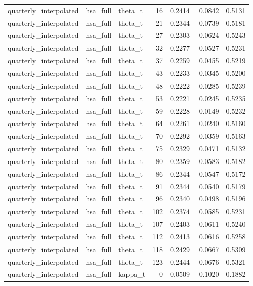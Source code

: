 \begin{tabular}{lllrrrr}
quarterly\_interpolated & hsa\_full & theta\_t & 16 & 0.2414 & 0.0842 & 0.5131 \\
quarterly\_interpolated & hsa\_full & theta\_t & 21 & 0.2344 & 0.0739 & 0.5181 \\
quarterly\_interpolated & hsa\_full & theta\_t & 27 & 0.2303 & 0.0624 & 0.5243 \\
quarterly\_interpolated & hsa\_full & theta\_t & 32 & 0.2277 & 0.0527 & 0.5231 \\
quarterly\_interpolated & hsa\_full & theta\_t & 37 & 0.2259 & 0.0455 & 0.5219 \\
quarterly\_interpolated & hsa\_full & theta\_t & 43 & 0.2233 & 0.0345 & 0.5200 \\
quarterly\_interpolated & hsa\_full & theta\_t & 48 & 0.2222 & 0.0285 & 0.5239 \\
quarterly\_interpolated & hsa\_full & theta\_t & 53 & 0.2221 & 0.0245 & 0.5235 \\
quarterly\_interpolated & hsa\_full & theta\_t & 59 & 0.2228 & 0.0149 & 0.5232 \\
quarterly\_interpolated & hsa\_full & theta\_t & 64 & 0.2261 & 0.0240 & 0.5160 \\
quarterly\_interpolated & hsa\_full & theta\_t & 70 & 0.2292 & 0.0359 & 0.5163 \\
quarterly\_interpolated & hsa\_full & theta\_t & 75 & 0.2329 & 0.0471 & 0.5132 \\
quarterly\_interpolated & hsa\_full & theta\_t & 80 & 0.2359 & 0.0583 & 0.5182 \\
quarterly\_interpolated & hsa\_full & theta\_t & 86 & 0.2344 & 0.0547 & 0.5172 \\
quarterly\_interpolated & hsa\_full & theta\_t & 91 & 0.2344 & 0.0540 & 0.5179 \\
quarterly\_interpolated & hsa\_full & theta\_t & 96 & 0.2340 & 0.0498 & 0.5196 \\
quarterly\_interpolated & hsa\_full & theta\_t & 102 & 0.2374 & 0.0585 & 0.5231 \\
quarterly\_interpolated & hsa\_full & theta\_t & 107 & 0.2403 & 0.0611 & 0.5240 \\
quarterly\_interpolated & hsa\_full & theta\_t & 112 & 0.2413 & 0.0616 & 0.5258 \\
quarterly\_interpolated & hsa\_full & theta\_t & 118 & 0.2429 & 0.0667 & 0.5309 \\
quarterly\_interpolated & hsa\_full & theta\_t & 123 & 0.2444 & 0.0676 & 0.5321 \\
quarterly\_interpolated & hsa\_full & kappa\_t & 0 & 0.0509 & -0.1020 & 0.1882 \\

\end{tabular}
